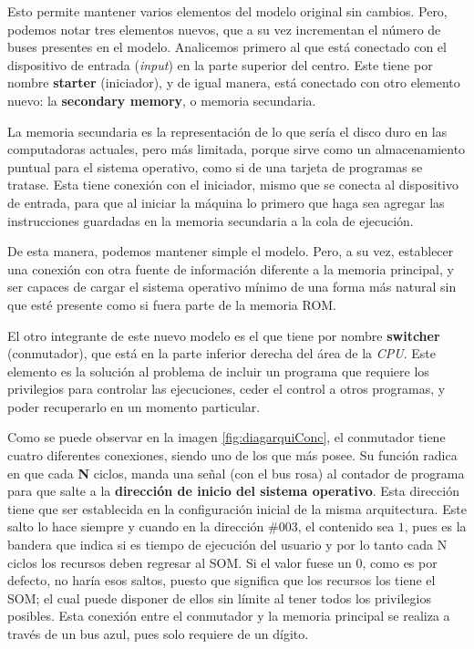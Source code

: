 \documentclass[letterpaper,12pt,oneside]{book}
\begin{document}
		
		Esto permite mantener varios elementos del modelo original sin cambios. Pero, podemos notar tres elementos nuevos, que a su vez
		incrementan el número de buses presentes en el modelo. Analicemos primero al que está conectado con el dispositivo de entrada (\textit{input}) 
		en la parte superior del centro. Este
		tiene por nombre \textbf{starter} (iniciador), y de igual manera, está conectado con otro elemento nuevo: la \textbf{secondary memory}, o 
		memoria secundaria.

  
		La memoria secundaria es la representación de lo que sería el disco duro en las computadoras actuales, pero más limitada, porque sirve 
		como un almacenamiento
		puntual para el sistema operativo, como si de una tarjeta de programas se tratase. Esta
		tiene conexión con el iniciador, mismo que se conecta al dispositivo de entrada, para que al iniciar la máquina lo primero que haga sea agregar 
		las instrucciones guardadas
		en la memoria secundaria a la cola de ejecución.
  
        De esta manera, podemos mantener simple el modelo. Pero, a su vez, establecer una conexión
		con otra fuente de información diferente a la memoria principal, y ser capaces de cargar el sistema operativo mínimo de una forma más natural 
		sin que esté presente como si fuera parte de la memoria ROM.
		
		
		El otro integrante de este nuevo modelo es el que tiene por nombre \textbf{switcher} (conmutador), que está en la parte inferior derecha del 
		área de la \textit{CPU}.
		Este elemento es la solución al problema de incluir un programa que requiere los privilegios para controlar las ejecuciones,
		ceder el control a otros programas, y poder recuperarlo en un momento particular.
  
        Como se puede observar en la imagen \ref{fig:diagarquiConc}, el conmutador tiene cuatro diferentes conexiones, siendo uno
		de los que más posee. Su función radica en que cada \textbf{N} ciclos, manda una señal (con el bus rosa) al contador de programa para que salte a la \textbf{dirección 
		de inicio del sistema operativo}. Esta dirección tiene que ser establecida en la configuración inicial de la misma arquitectura. Este salto lo hace siempre y cuando en la dirección
		\#003, el contenido sea $1$, pues es la bandera que indica si es tiempo de ejecución del usuario y por lo tanto cada N ciclos los recursos 
		deben regresar al SOM. Si
		el valor fuese un $0$, como es por defecto, no haría esos saltos, puesto que significa que los recursos los tiene el SOM; el cual puede disponer
		de ellos sin límite al tener todos los privilegios posibles. Esta conexión entre el conmutador y la memoria principal se realiza a través de un 
		bus azul, pues solo requiere de un dígito.
  
\end{document}
